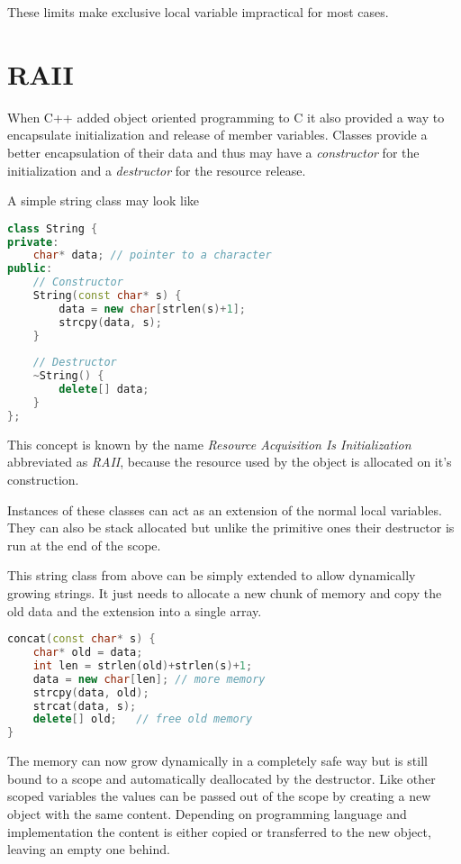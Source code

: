 \documentclass[conference,twocolumn]{IEEEtran}
\begin{document}
These limits make exclusive local variable impractical for most cases.

\section{RAII}
When C++ added object oriented programming to C it also provided a way to encapsulate initialization and release of member variables. Classes provide a better encapsulation of their data and thus may have a \emph{constructor} for the initialization and a \emph{destructor} for the resource release.

A simple string class may look like
\begin{lstlisting}[language=c++,frame=single]
class String {
private:
    char* data; // pointer to a character
public:
    // Constructor
    String(const char* s) {
        data = new char[strlen(s)+1];
        strcpy(data, s);
    }
    
    // Destructor
    ~String() {
        delete[] data;
    }
};
\end{lstlisting}

This concept is known by the name \emph{Resource Acquisition Is Initialization} abbreviated as \emph{RAII}, because the resource used by the object is allocated on it's construction.

Instances of these classes can act as an extension of the normal local variables. They can also be stack allocated but unlike the primitive ones their destructor is run at the end of the scope.

This string class from above can be simply extended to allow dynamically growing strings. It just needs to allocate a new chunk of memory and copy the old data and the extension into a single array.

\begin{minipage}{\linewidth}
\begin{lstlisting}[language=c++, frame=single]
concat(const char* s) {
    char* old = data;
    int len = strlen(old)+strlen(s)+1;
    data = new char[len]; // more memory
    strcpy(data, old);
    strcat(data, s);
    delete[] old;	// free old memory
}
\end{lstlisting}
\end{minipage}

The memory can now grow dynamically in a completely safe way but is still bound to a scope and automatically deallocated by the destructor. Like other scoped variables the values can be passed out of the scope by creating a new object with the same content. Depending on programming language and implementation the content is either copied or transferred to the new object, leaving an empty one behind.
\end{document}
